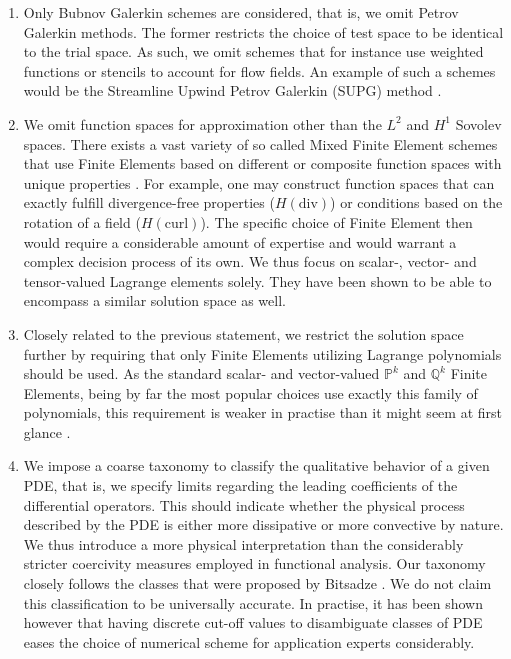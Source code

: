 \documentclass[sn-mathphys,Numbered]{sn-jnl}%
\theoremstyle{thmstyleone}%
\theoremstyle{thmstyletwo}%
\theoremstyle{thmstylethree}%
\begin{document}
\begin{enumerate}
    \item Only Bubnov Galerkin schemes are considered, that is, we omit Petrov Galerkin methods.
    The former restricts the choice of test space to be identical to the trial space.
    As such, we omit schemes that for instance use weighted functions or stencils to account for flow fields.
    An example of such a schemes would be the Streamline Upwind Petrov Galerkin (SUPG) method \cite{brooksStreamlineUpwindPetrovGalerkin1982}.
    \item We omit function spaces for approximation other than the $L^2$ and $H^1$ Sovolev spaces.
    There exists a vast variety of so called Mixed Finite Element schemes that use Finite Elements based on different or composite function spaces with unique properties \cite{ernTheoryPracticeFinite2004}.
    For example, one may construct function spaces that can exactly fulfill divergence-free properties ($H(\text{div})$) or conditions based on the rotation of a field ($H(\text{curl})$).
    The specific choice of Finite Element then would require a considerable amount of expertise and would warrant a complex decision process of its own.
    We thus focus on scalar-, vector- and tensor-valued Lagrange elements solely.
    They have been shown to be able to encompass a similar solution space as well.
    \item Closely related to the previous statement, we restrict the solution space further by requiring that only Finite Elements utilizing Lagrange polynomials should be used.
    As the standard scalar- and vector-valued $\mathbb{P}^k$ and $\mathbb{Q}^k$ Finite Elements, being by far the most popular choices use exactly this family of polynomials, this requirement is weaker in practise than it might seem at first glance \cite{lagrange-0,lagrange-1}.
    \item We impose a coarse taxonomy to classify the qualitative behavior of a given PDE, that is, we specify limits regarding the leading coefficients of the differential operators.
    This should indicate whether the physical process described by the PDE is either more dissipative or more convective by nature. 
    We thus introduce a more physical interpretation than the considerably stricter coercivity measures employed in functional analysis.
    Our taxonomy closely follows the classes that were proposed by Bitsadze \cite{bitsadze1988some}.
    We do not claim this classification to be universally accurate.
    In practise, it has been shown however that having discrete cut-off values to disambiguate classes of PDE eases the choice of numerical scheme for application experts considerably.

\end{enumerate}
\end{document}
